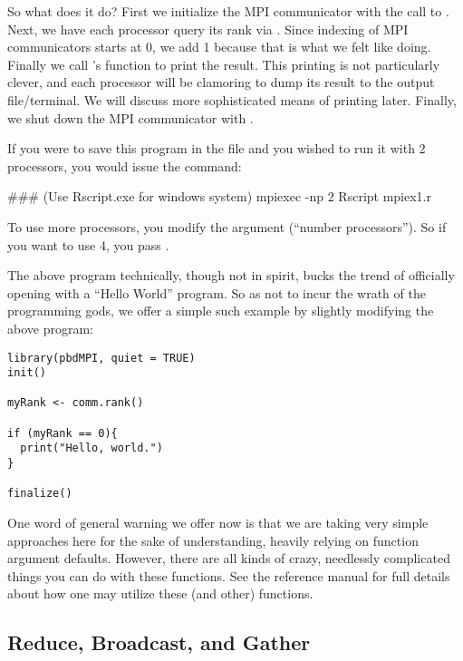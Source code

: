 So what does it do? First we initialize the MPI communicator with the
call to . Next, we have each processor query its rank
via . Since indexing of MPI communicators starts at 0,
we add 1 because that is what we felt like doing. Finally we call
's  function to print the result.
This printing is not particularly clever, and each processor will be
clamoring to dump its result to the output file/terminal. We will discuss
more sophisticated means of printing later. Finally, we shut down
the MPI communicator with .

If you were to save this program in the file  and you
wished to run it with 2 processors, you would issue the command:

\begin{Command}
### (Use Rscript.exe for windows system)
mpiexec -np 2 Rscript mpiex1.r
\end{Command}

To use more processors, you modify the  argument
(``number processors'').  So if you want to use 4, you pass .

The above program technically, though not in spirit, bucks the trend of
officially opening with a ``Hello World'' program. So as not to incur
the wrath of the programming gods, we offer a simple such example by
slightly modifying the above program:

\begin{lstlisting}[language=rr,title=Simple pbdMPI Example 1.5]
library(pbdMPI, quiet = TRUE)
init()

myRank <- comm.rank()

if (myRank == 0){
  print("Hello, world.")
}

finalize()
\end{lstlisting}

One word of general warning we offer now is that we are taking very simple
approaches here for the sake of understanding, heavily relying on function
argument defaults. However, there are all kinds of crazy, needlessly
complicated things you can do with these functions.
See the  reference manual for full details about how one may
utilize these (and other)  functions.



\subsection{Reduce, Broadcast, and Gather}

